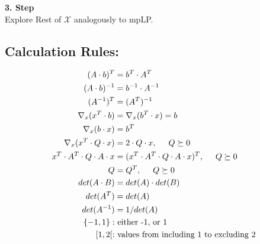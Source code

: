 \documentclass[10pt,parskip]{scrartcl}
\begin{document}
\begin{multicols*}{3}
\textbf{3. Step}\\
Explore Rest of $\mathcal{X}$ analogously to mpLP.


 
\subsection{Calculation Rules:}
\begin{align*}
(A \cdot b)^T &= b^T \cdot A^T\\
(A \cdot b)^{-1} &= b^{-1} \cdot A^{-1}\\
(A^{-1})^T &= (A^T)^{-1}\\
\nabla_x (x^T \cdot b) &= \nabla_x (b^T \cdot x) = b\\
\nabla_x (b \cdot x) &= b^T\\
\nabla_x (x^T \cdot Q \cdot x) &= 2 \cdot Q \cdot x, \hspace{0.5cm} Q \succeq 0\\
x^T \cdot A^T \cdot Q \cdot A \cdot x &= (x^T \cdot A^T \cdot Q \cdot A \cdot x)^T,  \hspace{0.5cm} Q \succeq 0\\
Q & = Q^T, \hspace{0.5cm} Q \succeq 0\\
det(A \cdot B) &= det(A) \cdot det(B)\\
det(A^T) &= det(A)\\
det(A^{-1}) &= 1/det(A)\\
\{-1,1\}: & \text{ either -1, or 1}\\
[1, 2[: & \text{ values from including 1 to excluding 2}
\end{align*}




\end{multicols*}
\end{document}

